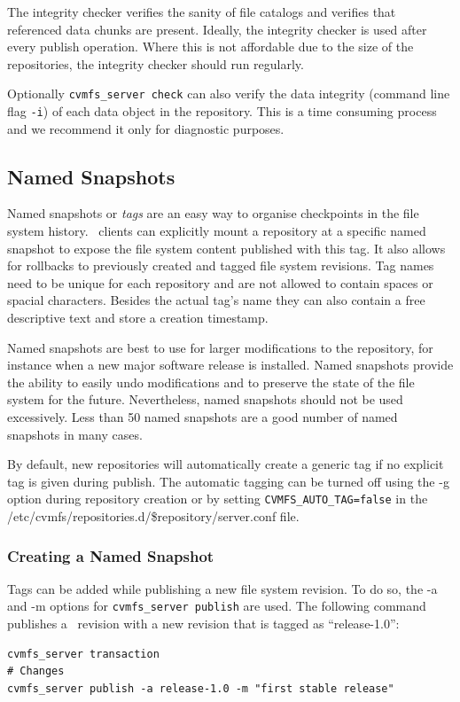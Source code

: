 The integrity checker verifies the sanity of file catalogs and verifies that referenced data chunks are present.
Ideally, the integrity checker is used after every publish operation.
Where this is not affordable due to the size of the repositories, the integrity checker should run regularly.

Optionally \texttt{cvmfs\_server check} can also verify the data integrity (command line flag \texttt{-i}) of each data object in the repository.
This is a time consuming process and we recommend it only for diagnostic purposes.


\subsection{Named Snapshots}
\label{sct:namedsnapshots}

Named snapshots or \emph{tags} are an easy way to organise checkpoints in the file system history.
\cvmfs\ clients can explicitly mount a repository at a specific named snapshot to expose the file system content published with this tag.
It also allows for rollbacks to previously created and tagged file system revisions.
Tag names need to be unique for each repository and are not allowed to contain spaces or spacial characters.
Besides the actual tag's name they can also contain a free descriptive text and store a creation timestamp.

Named snapshots are best to use for larger modifications to the repository, for instance when a new major software release is installed.
Named snapshots provide the ability to easily undo modifications and to preserve the state of the file system for the future.
Nevertheless, named snapshots should not be used excessively.
Less than 50 named snapshots are a good number of named snapshots in many cases.

By default, new repositories will automatically create a generic tag if no explicit tag is given during publish.
The automatic tagging can be turned off using the -g option during repository creation or by setting \texttt{CVMFS\_AUTO\_TAG=false} in the /etc/cvmfs/repositories.d/\$repository/server.conf file.

\subsubsection{Creating a Named Snapshot}
Tags can be added while publishing a new file system revision.
To do so, the -a and -m options for \texttt{cvmfs\_server publish} are used.
The following command publishes a \cvmfs\ revision with a new revision that is tagged as ``release-1.0'':
\begin{verbatim}
cvmfs_server transaction
# Changes
cvmfs_server publish -a release-1.0 -m "first stable release"
\end{verbatim}

